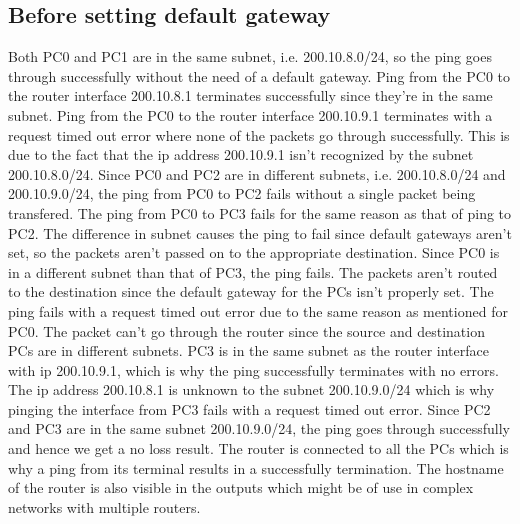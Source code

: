 \documentclass{lab_sheet}
\begin{document}
    \subsection*{Before setting default gateway}
    Both PC0 and PC1 are in the same subnet, i.e. 200.10.8.0/24, so the ping goes through successfully without the need of a default gateway.
    Ping from the PC0 to the router interface 200.10.8.1 terminates successfully since they're in the same subnet.
    Ping from the PC0 to the router interface 200.10.9.1 terminates with a request timed out error where none of the packets go through successfully. This is due to the fact that the ip address 200.10.9.1 isn't recognized by the subnet 200.10.8.0/24. 
    Since PC0 and PC2 are in different subnets, i.e. 200.10.8.0/24 and 200.10.9.0/24, the ping from PC0 to PC2 fails without a single packet being transfered. 
    The ping from PC0 to PC3 fails for the same reason as that of ping to PC2. The difference in subnet causes the ping to fail since default gateways aren't set, so the packets aren't passed on to the appropriate destination.
    Since PC0 is in a different subnet than that of PC3, the ping fails. The packets aren't routed to the destination since the default gateway for the PCs isn't properly set.
    The ping fails with a request timed out error due to the same reason as mentioned for PC0. The packet can't go through the router since the source and destination PCs are in different subnets.
    PC3 is in the same subnet as the router interface with ip 200.10.9.1, which is why the ping successfully terminates with no errors.
    The ip address 200.10.8.1 is unknown to the subnet 200.10.9.0/24 which is why pinging the interface from PC3 fails with a request timed out error.
    Since PC2 and PC3 are in the same subnet 200.10.9.0/24, the ping goes through successfully and hence we get a no loss result.
    The router is connected to all the PCs which is why a ping from its terminal results in a successfully termination. The hostname of the router is also visible in the outputs which might be of use in complex networks with multiple routers.
\end{document}
